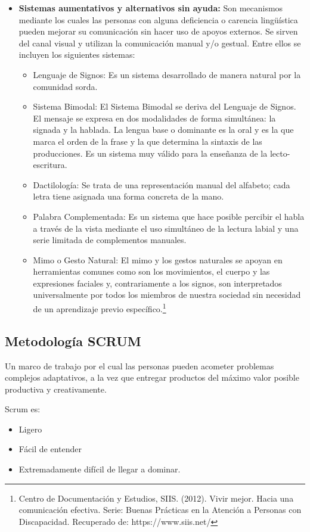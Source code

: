 \documentclass[12pt]{report}%
\begin{document}
\begin{itemize}
    \item \textbf{Sistemas aumentativos y alternativos sin ayuda:} Son mecanismos mediante los cuales las personas con alguna deficiencia o carencia lingüística pueden mejorar su comunicación sin hacer uso de apoyos externos. Se sirven del canal visual y utilizan la comunicación manual y/o gestual. Entre ellos se incluyen los siguientes sistemas: 
\begin{itemize}
\item Lenguaje de Signos: Es un sistema desarrollado de manera natural por la comunidad sorda. 
\item Sistema Bimodal: El Sistema Bimodal se deriva del Lenguaje de Signos. El mensaje se expresa en dos modalidades de forma simultánea: la signada y la hablada. La lengua base o dominante es la oral y es la que marca el orden de la frase y la que determina la sintaxis de las producciones. Es un sistema muy válido para la enseñanza de la lecto-escritura.
\item Dactilología: Se trata de una representación manual del alfabeto; cada letra tiene asignada una forma concreta de la mano.
\item Palabra Complementada: Es un sistema que hace posible percibir el habla a través de la vista mediante el uso simultáneo de la lectura labial y una serie limitada de complementos manuales. 
\item Mimo o Gesto Natural: El mimo y los gestos naturales se apoyan en herramientas comunes como son los movimientos, el cuerpo y las expresiones faciales y, contrariamente a los signos, son interpretados universalmente por todos los miembros de nuestra sociedad sin necesidad de un aprendizaje previo específico.\footnote{Centro de Documentación y Estudios, SIIS. (2012). Vivir mejor. Hacia una comunicación efectiva. Serie: Buenas Prácticas en la Atención a Personas con Discapacidad. Recuperado de: https://www.siis.net/}
\end{itemize}
\end{itemize}

\newpage
\subsection{Metodología SCRUM}
Un marco de trabajo por el cual las personas pueden acometer problemas complejos adaptativos, a la vez que entregar productos del máximo valor posible productiva y creativamente. 

Scrum es:

\begin{itemize}
\item Ligero 
\item Fácil de entender 
\item Extremadamente difícil de llegar a dominar.
\end{itemize}
\end{document}
